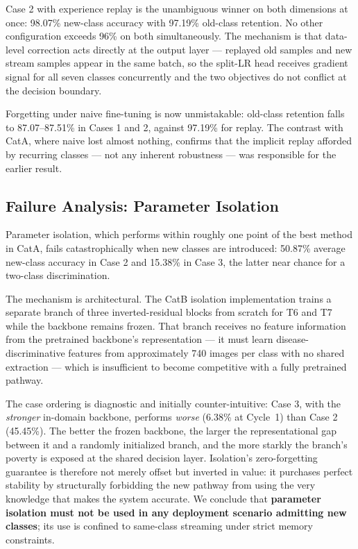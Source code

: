 \documentclass[journal]{IEEEtran}
\begin{document}
Case 2 with experience replay is the unambiguous winner on both dimensions at once:
98.07\% new-class accuracy with 97.19\% old-class retention. No other configuration
exceeds 96\% on both simultaneously. The mechanism is that data-level correction acts
directly at the output layer --- replayed old samples and new stream samples appear in
the same batch, so the split-LR head receives gradient signal for all seven classes
concurrently and the two objectives do not conflict at the decision boundary.

Forgetting under naive fine-tuning is now unmistakable: old-class retention falls to
87.07--87.51\% in Cases 1 and 2, against 97.19\% for replay. The contrast with CatA,
where naive lost almost nothing, confirms that the implicit replay afforded by
recurring classes --- not any inherent robustness --- was responsible for the earlier
result.

\subsection{Failure Analysis: Parameter Isolation}
\label{subsec:isolation}

Parameter isolation, which performs within roughly one point of the best method in
CatA, fails catastrophically when new classes are introduced: 50.87\% average
new-class accuracy in Case 2 and 15.38\% in Case 3, the latter near chance for a
two-class discrimination.

The mechanism is architectural. The CatB isolation implementation trains a separate
branch of three inverted-residual blocks from scratch for T6 and T7 while the
backbone remains frozen. That branch receives no feature information from the
pretrained backbone's representation --- it must learn disease-discriminative features
from approximately 740 images per class with no shared extraction --- which is
insufficient to become competitive with a fully pretrained pathway.

The case ordering is diagnostic and initially counter-intuitive: Case 3, with the
\emph{stronger} in-domain backbone, performs \emph{worse} (6.38\% at Cycle~1) than
Case 2 (45.45\%). The better the frozen backbone, the larger the representational gap
between it and a randomly initialized branch, and the more starkly the branch's
poverty is exposed at the shared decision layer. Isolation's zero-forgetting guarantee
is therefore not merely offset but inverted in value: it purchases perfect stability
by structurally forbidding the new pathway from using the very knowledge that makes
the system accurate. We conclude that \textbf{parameter isolation must not be used in
any deployment scenario admitting new classes}; its use is confined to same-class
streaming under strict memory constraints.
\end{document}
